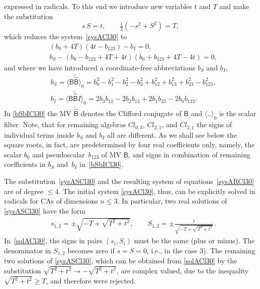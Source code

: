 \documentclass{birkjour}
\newcommand{\cl}[2]{\ensuremath{\mathit{Cl}_{#1,#2}}}
\newcommand{\cliffordconjugate}[1]{\widetilde{\wideparen{#1}}}
\def\B{\mathsf{B}}
\begin{document}
expressed in radicals. To this end we introduce new variables $t$
and $T$ and make the substitution
\begin{equation}\label{sysASCl30}
  s\,S = t,\qquad  \tfrac{1}{2}(-s^2 + S^2) = T,
\end{equation}
which reduces the system~\eqref{sysACl30} to
\begin{equation}\label{sysARCl30}
\begin{split}
&(b_{0}+4 T) (4 t-b_{123})-b_{I}=0,\\
&b_{S}-(b_{0}-b_{123}+4 T+4 t) (b_{0}+b_{123}+4 T-4 t)=0,
\end{split}\end{equation}
and where we have introduced a coordinate-free abbreviations
$b_{S}$ and $b_{I}$,
\begin{equation}\label{bSbICl30}
\begin{split}
&b_{S}= \langle \B \cliffordconjugate{\B}\rangle_0 =
b_{0}^2-b_{1}^2-b_{2}^2-b_{3}^2+b_{12}^2+b_{13}^2+b_{23}^2-b_{123}^2,\\
&b_{I}= \langle \B \cliffordconjugate{\B} I \rangle_0 = 2 b_{3}
b_{12}-2 b_{2} b_{13}+2 b_{1} b_{23}-2 b_{0} b_{123}.
\end{split}
\end{equation}
In \eqref{bSbICl30} the MV $\cliffordconjugate{\B}$ denotes the
Clifford conjugate of $\B$ and $\langle..\rangle_0$ is the scalar
filter. Note, that for remaining  algebras \cl{0}{3},
\cl{2}{1}, and \cl{2}{1} the signs of individual terms inside
$b_S$ and $b_I $ all are different. As we shall see below the
square  roots, in fact, are predetermined by four real
coefficients only, namely, the  scalar $b_0$ and
pseudoscalar~$b_{123}$ of MV $\B$, and signs in combination
of remaining coefficients in $b_{S}$ and~$b_{I}$
in~\eqref{bSbICl30}.


The substitution~\eqref{sysASCl30} and the resulting system of
equations~\eqref{sysARCl30} are of degree $\le 4$. The initial
system \eqref{sysACl30}, thus, can be explicitly solved in
radicals for CAs of  dimensions $n\le 3$. In particular, two real
solutions of \eqref{sysASCl30} have the form
\begin{equation}\label{solACl30}
\begin{split}
  &s_{1,2} =\pm\sqrt{-T+\sqrt{T^2+ t^2}},\qquad S_{1,2}
=\pm\frac{t}{\sqrt{-T+\sqrt{T^2+ t^2}}}\,.
\end{split}\end{equation}
  In~\eqref{solACl30}, the signs in pairs $(s_i,S_i)$ must be the
same (plus or minus). The denominator in $S_{1,2}$ becomes zero if
  $s=S=0$, i.e., in the case 3). The remaining two solutions of
\eqref{sysASCl30}, which can be obtained from \eqref{solACl30} by
the substitution $\sqrt{T^2+ t^2}\to -\sqrt{T^2+ t^2}$, are
complex valued, due to the inequality $\sqrt{T^2+ t^2}\ge T$, and
  therefore were rejected.
\end{document}
